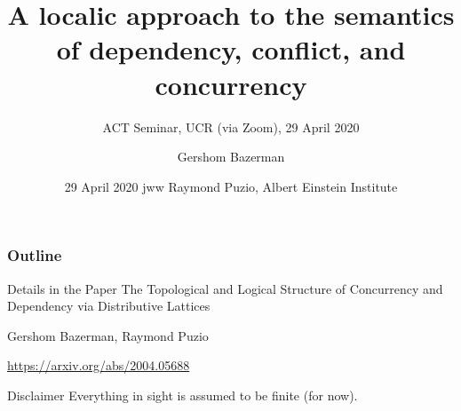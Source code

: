 \documentclass{beamer}
\title[Dependency, Conflict, and Concurrency]{A localic approach to the semantics of dependency, conflict, and concurrency}
\subtitle{ACT Seminar, UCR (via Zoom), 29 April 2020}
\author{Gershom Bazerman}
\date{29 April 2020}
\institute{Awake Security}
\date[\today]{ \tiny{jww Raymond Puzio, Albert Einstein Institute}}
\begin{document}
\begin{frame}
		\titlepage
\end{frame}
\begin{frame}
\frametitle{Outline}
\tableofcontents
\end{frame}


\begin{frame}
\begin{block}{Details in the Paper}
The Topological and Logical Structure of Concurrency and Dependency via Distributive Lattices

Gershom Bazerman, Raymond Puzio

\url{https://arxiv.org/abs/2004.05688}
\end{block}
\end{frame}


\begin{frame}
\begin{block}{Disclaimer}
Everything in sight is assumed to be finite (for now).
\end{block}
\end{frame}
\end{document}
